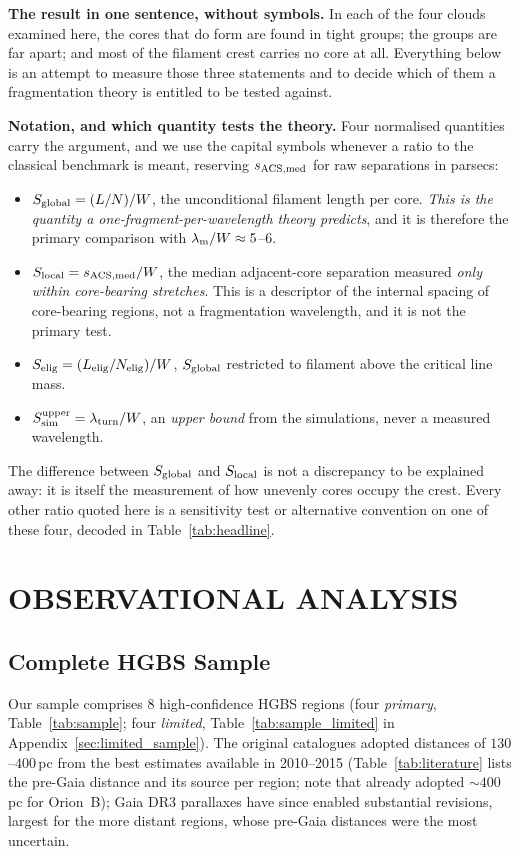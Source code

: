 \documentclass[usenatbib,twoside,twocolumn]{mnras}
\begin{document}
\noindent\textbf{The result in one sentence, without symbols.} In each of the four clouds examined here, the cores that do form are found in tight groups; the groups are far apart; and most of the filament crest carries no core at all. Everything below is an attempt to measure those three statements and to decide which of them a fragmentation theory is entitled to be tested against.

\smallskip\noindent\textbf{Notation, and which quantity tests the theory.} Four normalised quantities carry the argument, and we use the capital symbols whenever a ratio to the classical benchmark is meant, reserving $s_{\rm ACS,med}$ for raw separations in parsecs:
\begin{itemize}\setlength{\itemsep}{1pt}
\item $S_{\rm global}=(L/N)/W$, the unconditional filament length per core. \emph{This is the quantity a one-fragment-per-wavelength theory predicts}, and it is therefore the primary comparison with $\lambda_{\rm m}/W\approx5$--$6$.
\item $S_{\rm local}=s_{\rm ACS,med}/W$, the median adjacent-core separation measured \emph{only within core-bearing stretches}. This is a descriptor of the internal spacing of core-bearing regions, not a fragmentation wavelength, and it is not the primary test.
\item $S_{\rm elig}=(L_{\rm elig}/N_{\rm elig})/W$, $S_{\rm global}$ restricted to filament above the critical line mass.
\item $S_{\rm sim}^{\rm upper}=\lambda_{\rm turn}/W$, an \emph{upper bound} from the simulations, never a measured wavelength.
\end{itemize}
The difference between $S_{\rm global}$ and $S_{\rm local}$ is not a discrepancy to be explained away: it is itself the measurement of how unevenly cores occupy the crest. Every other ratio quoted here is a sensitivity test or alternative convention on one of these four, decoded in Table~\ref{tab:headline}.

\section{OBSERVATIONAL ANALYSIS}

\subsection{Complete HGBS Sample}

Our sample comprises 8 high-confidence HGBS regions (four \emph{primary}, Table~\ref{tab:sample}; four \emph{limited}, Table~\ref{tab:sample_limited} in Appendix~\ref{sec:limited_sample}). The original catalogues \citep{Konyves2015, Konyves2020, Ladjelate2020, Pezzuto2021} adopted distances of $130$--$400$\,pc from the best estimates available in 2010--2015 (Table~\ref{tab:literature} lists the pre-Gaia distance and its source per region; note that \citealt{Konyves2020} already adopted $\sim400$\,pc for Orion~B); Gaia DR3 parallaxes \citep{Zhang2023} have since enabled substantial revisions, largest for the more distant regions, whose pre-Gaia distances were the most uncertain.
\end{document}

